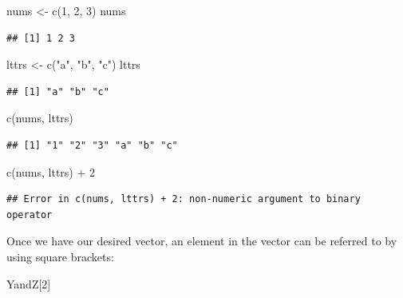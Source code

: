 \documentclass[
]{book}
\newenvironment{Shaded}{\begin{snugshade}}{\end{snugshade}}
\newcommand{\DecValTok}[1]{\textcolor[rgb]{0.00,0.00,0.81}{#1}}
\newcommand{\FunctionTok}[1]{\textcolor[rgb]{0.00,0.00,0.00}{#1}}
\newcommand{\NormalTok}[1]{#1}
\newcommand{\OtherTok}[1]{\textcolor[rgb]{0.56,0.35,0.01}{#1}}
\newcommand{\SpecialCharTok}[1]{\textcolor[rgb]{0.00,0.00,0.00}{#1}}
\newcommand{\StringTok}[1]{\textcolor[rgb]{0.31,0.60,0.02}{#1}}
\begin{document}
\begin{Shaded}
\begin{Highlighting}[]
\NormalTok{nums }\OtherTok{\textless{}{-}} \FunctionTok{c}\NormalTok{(}\DecValTok{1}\NormalTok{, }\DecValTok{2}\NormalTok{, }\DecValTok{3}\NormalTok{)}
\NormalTok{nums}
\end{Highlighting}
\end{Shaded}

\begin{verbatim}
## [1] 1 2 3
\end{verbatim}

\begin{Shaded}
\begin{Highlighting}[]
\NormalTok{lttrs }\OtherTok{\textless{}{-}} \FunctionTok{c}\NormalTok{(}\StringTok{"a"}\NormalTok{, }\StringTok{"b"}\NormalTok{, }\StringTok{"c"}\NormalTok{)}
\NormalTok{lttrs}
\end{Highlighting}
\end{Shaded}

\begin{verbatim}
## [1] "a" "b" "c"
\end{verbatim}

\begin{Shaded}
\begin{Highlighting}[]
\FunctionTok{c}\NormalTok{(nums, lttrs)}
\end{Highlighting}
\end{Shaded}

\begin{verbatim}
## [1] "1" "2" "3" "a" "b" "c"
\end{verbatim}

\begin{Shaded}
\begin{Highlighting}[]
\FunctionTok{c}\NormalTok{(nums, lttrs) }\SpecialCharTok{+} \DecValTok{2}
\end{Highlighting}
\end{Shaded}

\begin{verbatim}
## Error in c(nums, lttrs) + 2: non-numeric argument to binary operator
\end{verbatim}

Once we have our desired vector, an element in the vector can be referred to by using square brackets:

\begin{Shaded}
\begin{Highlighting}[]
\NormalTok{YandZ[}\DecValTok{2}\NormalTok{]}
\end{Highlighting}
\end{Shaded}
\end{document}
